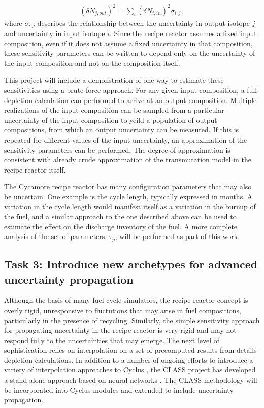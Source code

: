 \documentclass[dvips,12pt]{article}
\newcommand{\unc}[1]
{ \delta #1 }
\newcommand{\uncsq}[1]
{ \left(\unc{#1}\right)^2 }
\begin{document}
\begin{align}
\uncsq{N_{j,out}} = \sum_i \uncsq{N_{i,in}} \sigma_{i,j},
\end{align}
where $\sigma_{i,j}$ describes the relationship
between the uncertainty in output isotope $j$ and
uncertainty in input isotope $i$.  Since the
recipe reactor assumes a fixed input composition,
even if it does not assume a fixed uncertainty in
that composition, these sensitivity parameters can
be written to depend only on the uncertainty of
the input composition and not on the composition
itself.  

This project will include a demonstration of one
way to estimate these sensitivities using a brute
force approach.  For any given input composition,
a full depletion calculation can performed to
arrive at an output composition.  Multiple
realizations of the input composition can be
sampled from a particular uncertainty of the input
composition to yeild a population of output
compositions, from which an output uncertainty can
be measured.  If this is repeated for different
values of the input uncertainty, an approximation
of the sensitivity parameters can be performed.
The degree of approximation is consistent with
already crude approximation of the transmutation
model in the recipe reactor itself.

The Cycamore recipe reactor has many configuration
parameters that may also be uncertain.  One
example is the cycle length, typically expressed
in months.  A variation in the cycle length would
manifest itself as a variation in the burnup of
the fuel, and a similar approach to the one
described above can be used to estimate the effect
on the discharge inventory of the fuel.  A more
complete analysis of the set of parameters,
$\tau_p$, will be performed as part of this work.

\subsection{Task 3: Introduce new archetypes for advanced uncertainty propagation}

Although the basis of many fuel cycle simulators,
the recipe reactor concept is overly rigid,
unresponsive to fluctutions that may arise in fuel
compositions, particularly in the presence of
recycling.  Similarly, the simple sensitivity
approach for propagating uncertainty in the recipe
reactor is very rigid and may not respond fully to
the uncertainties that may emerge.  The next level
of sophistication relies on interpolation on a set
of precomputed results from details depletion
calculations.  In addition to a number of ongoing
efforts to introduce a variety of interpolation
approaches to Cyclus \cite{britelite, cyborg}, the
CLASS project\cite{CLASS} has developed a
stand-alone approach based on neural networks \cite{Leniau.ANE.2015}. The
CLASS methodology will be incorporated into Cyclus
modules and extended to include uncertainty
propagation.
\end{document}
